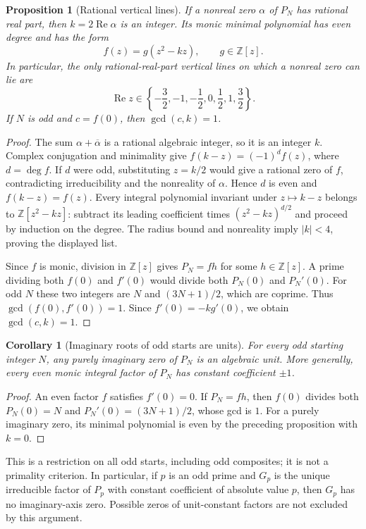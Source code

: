 \documentclass[11pt,a4paper]{article}
\newtheorem{proposition}[theorem]{Proposition}
\newtheorem{corollary}[theorem]{Corollary}
\theoremstyle{definition}
\theoremstyle{remark}
\numberwithin{equation}{section}
\begin{document}
\begin{proposition}[Rational vertical lines]
If a nonreal zero $\alpha$ of $P_N$ has rational real part, then
$k=2\operatorname{Re}\alpha$ is an integer. Its monic minimal polynomial has
even degree and has the form
\[
 f(z)=g(z^2-kz),\qquad g\in\mathbb Z[z].
\]
In particular, the only rational-real-part vertical lines on which a nonreal
zero can lie are
\[
 \operatorname{Re}z\in
 \left\{-\frac32,-1,-\frac12,0,\frac12,1,\frac32\right\}.
\]
If $N$ is odd and $c=f(0)$, then $\gcd(c,k)=1$.
\end{proposition}
\begin{proof}
The sum $\alpha+\overline\alpha$ is a rational algebraic integer, so it is an
integer $k$. Complex conjugation and minimality give
$f(k-z)=(-1)^df(z)$, where $d=\deg f$. If $d$ were odd, substituting $z=k/2$
would give a rational zero of $f$, contradicting irreducibility and the
nonreality of $\alpha$. Hence $d$ is even and $f(k-z)=f(z)$.
Every integral polynomial invariant under $z\mapsto k-z$ belongs to
$\mathbb Z[z^2-kz]$: subtract its leading coefficient times
$(z^2-kz)^{d/2}$ and proceed by induction on the degree. The radius bound
and nonreality imply $|k|<4$, proving the displayed list.

Since $f$ is monic, division in $\mathbb Z[z]$ gives $P_N=fh$ for some
$h\in\mathbb Z[z]$. A prime dividing both $f(0)$ and $f'(0)$ would divide
both $P_N(0)$ and $P_N'(0)$. For odd $N$ these two integers are
$N$ and $(3N+1)/2$, which are coprime. Thus
$\gcd(f(0),f'(0))=1$. Since $f'(0)=-k g'(0)$, we obtain
$\gcd(c,k)=1$.
\end{proof}

\begin{corollary}[Imaginary roots of odd starts are units]
For every odd starting integer $N$, any purely imaginary zero of $P_N$ is
an algebraic unit. More generally, every even monic integral factor of
$P_N$ has constant coefficient $\pm1$.
\end{corollary}
\begin{proof}
An even factor $f$ satisfies $f'(0)=0$. If $P_N=fh$, then $f(0)$ divides
both $P_N(0)=N$ and $P_N'(0)=(3N+1)/2$, whose gcd is $1$.
For a purely imaginary zero, its minimal polynomial is even by the
preceding proposition with $k=0$.
\end{proof}

This is a restriction on all odd starts, including odd composites; it is not
a primality criterion. In particular, if $p$ is an odd prime and $G_p$ is
the unique irreducible factor of $P_p$ with constant coefficient of absolute
value $p$, then $G_p$ has no imaginary-axis zero. Possible zeros of
unit-constant factors are not excluded by this argument.
\end{document}
